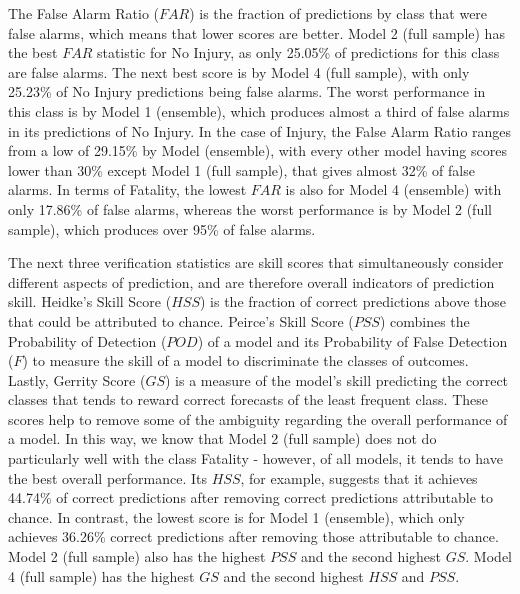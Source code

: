 \documentclass[]{elsarticle} %
\begin{document}
The False Alarm Ratio (\(FAR\)) is the fraction of predictions by class
that were false alarms, which means that lower scores are better. Model
2 (full sample) has the best \(FAR\) statistic for No Injury, as only
25.05\% of predictions for this class are false alarms. The next best
score is by Model 4 (full sample), with only 25.23\% of No Injury
predictions being false alarms. The worst performance in this class is
by Model 1 (ensemble), which produces almost a third of false alarms in
its predictions of No Injury. In the case of Injury, the False Alarm
Ratio ranges from a low of 29.15\% by Model (ensemble), with every other
model having scores lower than 30\% except Model 1 (full sample), that
gives almost 32\% of false alarms. In terms of Fatality, the lowest
\(FAR\) is also for Model 4 (ensemble) with only 17.86\% of false
alarms, whereas the worst performance is by Model 2 (full sample), which
produces over 95\% of false alarms.

The next three verification statistics are skill scores that
simultaneously consider different aspects of prediction, and are
therefore overall indicators of prediction skill. Heidke's Skill Score
(\(HSS\)) is the fraction of correct predictions above those that could
be attributed to chance. Peirce's Skill Score (\(PSS\)) combines the
Probability of Detection (\(POD\)) of a model and its Probability of
False Detection (\(F\)) to measure the skill of a model to discriminate
the classes of outcomes. Lastly, Gerrity Score (\(GS\)) is a measure of
the model's skill predicting the correct classes that tends to reward
correct forecasts of the least frequent class. These scores help to
remove some of the ambiguity regarding the overall performance of a
model. In this way, we know that Model 2 (full sample) does not do
particularly well with the class Fatality - however, of all models, it
tends to have the best overall performance. Its \(HSS\), for example,
suggests that it achieves 44.74\% of correct predictions after removing
correct predictions attributable to chance. In contrast, the lowest
score is for Model 1 (ensemble), which only achieves 36.26\% correct
predictions after removing those attributable to chance. Model 2 (full
sample) also has the highest \(PSS\) and the second highest \(GS\).
Model 4 (full sample) has the highest \(GS\) and the second highest
\(HSS\) and \(PSS\).
\end{document}
